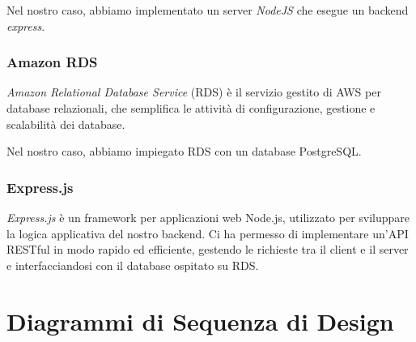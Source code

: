 Nel nostro caso, abbiamo implementato un server \textit{NodeJS} che esegue un backend \textit{express}.

\subsubsection{Amazon RDS}
\textit{Amazon Relational Database Service} (RDS) è il servizio gestito di AWS per database relazionali, che semplifica le attività di configurazione, gestione e scalabilità dei database. 

Nel nostro caso, abbiamo impiegato RDS con un database PostgreSQL.

\subsubsection{Express.js}
\textit{Express.js} è un framework per applicazioni web Node.js, utilizzato per sviluppare la logica applicativa del nostro backend. Ci ha permesso di implementare un'API RESTful in modo rapido ed efficiente, gestendo le richieste tra il client e il server e interfacciandosi con il database ospitato su RDS.

\pagebreak
\section{Diagrammi di Sequenza di Design}
